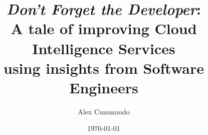 \title{\textit{Don't Forget the Developer}:\\A tale of improving Cloud Intelligence Services\\using insights from Software Engineers}
\author{Alex Cummaudo}
\date{\today}

\def \thedegree {Doctor of Philosophy}
\def \thedepartment {Applied Artificial Intelligence Institute}
\def \theinstitution {Deakin University}
\def \thelocation {Melbourne, Australia}
\def \theauthorspostnominals {BSc \textit{Swinburne}, BIT(Hons)}

